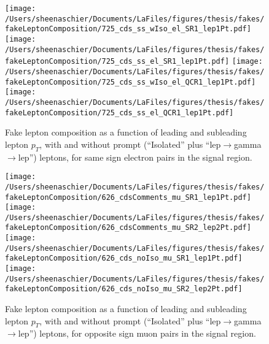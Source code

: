   
\begin{figure}[htb]
        \centering
        \texttt{[image: /Users/sheenaschier/Documents/LaFiles/figures/thesis/fakes/fakeLeptonComposition/725\_cds\_ss\_wIso\_el\_SR1\_lep1Pt.pdf]}
        \texttt{[image: /Users/sheenaschier/Documents/LaFiles/figures/thesis/fakes/fakeLeptonComposition/725\_cds\_ss\_el\_SR1\_lep1Pt.pdf]}
                \texttt{[image: /Users/sheenaschier/Documents/LaFiles/figures/thesis/fakes/fakeLeptonComposition/725\_cds\_ss\_wIso\_el\_QCR1\_lep1Pt.pdf]}
                       \texttt{[image: /Users/sheenaschier/Documents/LaFiles/figures/thesis/fakes/fakeLeptonComposition/725\_cds\_ss\_el\_QCR1\_lep1Pt.pdf]}
        \caption{Fake lepton composition as a function of leading and subleading lepton $p_{T}$, with and without prompt (``Isolated'' plus ``lep$\to$gamma$\to$lep'') leptons, for same sign electron pairs in the signal region.}
        \label{fig:elSSSR}
\end{figure}




\begin{figure}[htb]
        \centering
        \texttt{[image: /Users/sheenaschier/Documents/LaFiles/figures/thesis/fakes/fakeLeptonComposition/626\_cdsComments\_mu\_SR1\_lep1Pt.pdf]}
        \texttt{[image: /Users/sheenaschier/Documents/LaFiles/figures/thesis/fakes/fakeLeptonComposition/626\_cdsComments\_mu\_SR2\_lep2Pt.pdf]}
        \texttt{[image: /Users/sheenaschier/Documents/LaFiles/figures/thesis/fakes/fakeLeptonComposition/626\_cds\_noIso\_mu\_SR1\_lep1Pt.pdf]}
        \texttt{[image: /Users/sheenaschier/Documents/LaFiles/figures/thesis/fakes/fakeLeptonComposition/626\_cds\_noIso\_mu\_SR2\_lep2Pt.pdf]}
        \caption{Fake lepton composition as a function of leading and subleading lepton $p_{T}$, with and without prompt (``Isolated'' plus ``lep$\to$gamma$\to$lep'') leptons, for opposite sign muon pairs in the signal region.}
        \label{fig:muSR}
\end{figure}

